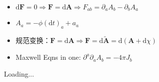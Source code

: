 \documentclass{article}
\begin{document}
\begin{itemize}
    \item $\mathrm{d}\boldsymbol{F}=0\Rightarrow\boldsymbol{F}=\mathrm{d}\boldsymbol{A}\Rightarrow F_{ab}=\partial_aA_b-\partial_bA_a$
    \item $A_a=-\phi(\mathrm{d}t)_a+a_a$
    \item 规范变换：$\boldsymbol{F}=\mathrm{d}\boldsymbol{A}\Rightarrow\boldsymbol{F}=\mathrm{d}\tilde{\boldsymbol{A}}=\mathrm{d}(\boldsymbol{A}+\mathrm{d}\chi)$
    \item Maxwell Eqns in one: $\partial^a\partial_aA_b=-4\pi J_b$
\end{itemize}

Loading...
\end{document}
